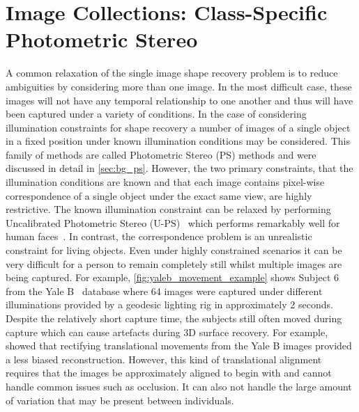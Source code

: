 \chapter{Image Collections: Class-Specific Photometric Stereo}\label{ch:imag_coll}
\minitoc{}
A common relaxation of the single image shape recovery problem is to reduce
ambiguities by considering more than one image. In the most difficult case,
these images will not have any temporal relationship to one another and thus
will have been captured under a variety of conditions. In the case of
considering illumination constraints for shape recovery a number of images
of a single object in a fixed position under known illumination conditions
may be considered. This family of methods are called Photometric Stereo (PS)
methods and were discussed in detail in \cref{sec:bg_ps}. However, the two
primary constraints, that the illumination conditions are known and that each
image contains pixel-wise correspondence of a single object under the exact
same view, are highly restrictive. The known illumination constraint can be
relaxed by performing
Uncalibrated Photometric Stereo (U-PS)~\cite{hayakawa1994photometric,%
basri2007photometric} which performs remarkably well for
human faces~\cite{KemelmacherShlizerman:2013iv,kemelmacher2011face,%
kemelmacher2012collection}. In contrast, the correspondence problem is an
unrealistic constraint for living objects. Even under highly constrained
scenarios it can be very difficult for a person to remain completely still
whilst multiple images are being captured.
For example, \cref{fig:yaleb_movement_example} shows Subject 6 from the
Yale B~\cite{georghiades2001fromfew} database where 64 images were captured
under different illuminations provided by a geodesic lighting rig in
approximately 2 seconds. Despite the relatively short capture time, the subjects
still often moved during capture which can cause artefacts during 3D surface
recovery. For example, \citet{harrison2012translational} showed that rectifying
translational movements from the Yale B images provided a less biased
reconstruction. However, this kind of translational alignment requires that the
images be approximately aligned to begin with and cannot handle common issues
such as occlusion. It can also not handle the large amount of variation that
may be present between individuals.

